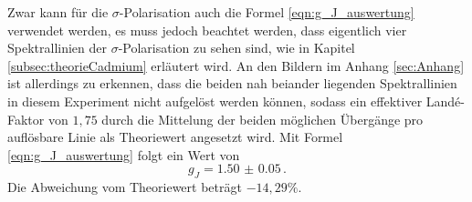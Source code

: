 Zwar kann für die $\sigma$-Polarisation auch die Formel \eqref{eqn:g_J_auswertung} verwendet werden, es muss jedoch beachtet werden, dass eigentlich vier Spektrallinien der $\sigma$-Polarisation zu sehen sind, wie in Kapitel \ref{subsec:theorieCadmium} erläutert wird. An den Bildern im Anhang \ref{sec:Anhang} ist allerdings zu erkennen, dass die beiden nah beiander liegenden Spektrallinien in diesem Experiment nicht aufgelöst werden können, sodass ein effektiver Landé-Faktor von $1,75$ durch die Mittelung der beiden möglichen Übergänge pro auflösbare Linie als Theoriewert angesetzt wird.
Mit Formel \eqref{eqn:g_J_auswertung} folgt ein Wert von
\begin{equation}
  g_J = \num{1.50(5)}\,.
\end{equation}
Die Abweichung vom Theoriewert beträgt $-14{,}29\%$.
